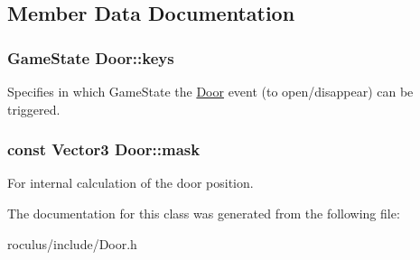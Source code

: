\subsection{\-Member \-Data \-Documentation}
\hypertarget{classDoor_a3a6559434b958ebf3514348d5065c413}{
\subsubsection[{keys}]{\setlength{\rightskip}{0pt plus 5cm}\-Game\-State {\bf \-Door\-::keys}}}\label{classDoor_a3a6559434b958ebf3514348d5065c413}
\-Specifies in which \-Game\-State the \hyperlink{classDoor}{\-Door} event (to open/disappear) can be triggered. \hypertarget{classDoor_a2e00eb490d6c7ea3a37759361fb3d188}{
\subsubsection[{mask}]{\setlength{\rightskip}{0pt plus 5cm}const \-Vector3 {\bf \-Door\-::mask}}}\label{classDoor_a2e00eb490d6c7ea3a37759361fb3d188}
\-For internal calculation of the door position. 

\-The documentation for this class was generated from the following file\-:\begin{DoxyCompactItemize}
\item 
roculus/include/\-Door.\-h\end{DoxyCompactItemize}
